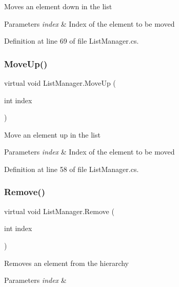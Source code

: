 Moves an element down in the list 


\begin{DoxyParams}{Parameters}
{\em index} & Index of the element to be moved\\
\hline
\end{DoxyParams}


Definition at line 69 of file List\+Manager.\+cs.

\mbox{\label{class_list_manager_a7833ed56885fd00805d1b19c39f347b9}} 
\subsubsection{Move\+Up()}
{\footnotesize\ttfamily virtual void List\+Manager.\+Move\+Up (\begin{DoxyParamCaption}\item[{int}]{index }\end{DoxyParamCaption})\hspace{0.3cm}{\ttfamily [virtual]}}



Move an element up in the list 


\begin{DoxyParams}{Parameters}
{\em index} & Index of the element to be moved\\
\hline
\end{DoxyParams}


Definition at line 58 of file List\+Manager.\+cs.

\mbox{\label{class_list_manager_aee6e3b1cb62e22ab3a53fe358a7bea62}} 
\subsubsection{Remove()}
{\footnotesize\ttfamily virtual void List\+Manager.\+Remove (\begin{DoxyParamCaption}\item[{int}]{index }\end{DoxyParamCaption})\hspace{0.3cm}{\ttfamily [virtual]}}



Removes an element from the hierarchy 


\begin{DoxyParams}{Parameters}
{\em index} & \\
\hline
\end{DoxyParams}



